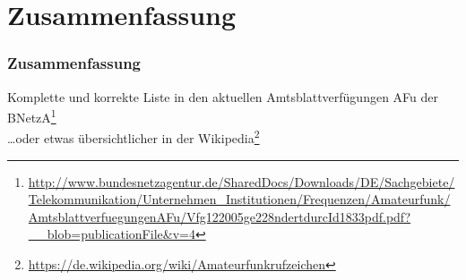 \section{Zusammen\-fassung}

\begin{frame}
    \frametitle{Zusammenfassung}

    Komplette und korrekte Liste in den aktuellen Amtsblattverfügungen AFu der
    BNetzA\footnote{\url{http://www.bundesnetzagentur.de/SharedDocs/Downloads/DE/Sachgebiete/Telekommunikation/Unternehmen_Institutionen/Frequenzen/Amateurfunk/AmtsblattverfuegungenAFu/Vfg122005ge228ndertdurcId1833pdf.pdf?__blob=publicationFile&v=4}}\\[2em]

    \dots oder etwas übersichtlicher in der Wikipedia\footnote{\url{https://de.wikipedia.org/wiki/Amateurfunkrufzeichen}}

%
   
\end{frame}

\renewcommand{\refname}{Referenzen}

